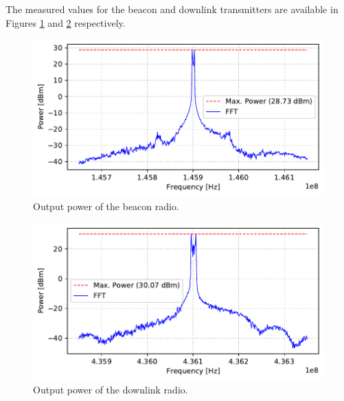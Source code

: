 The measured values for the beacon and downlink transmitters are available in Figures \ref{fig:beacon-power} and \ref{fig:downlink-power} respectively.

\begin{figure}[!ht]
    \begin{center}
        \includegraphics[width=\textwidth]{curves/beacon_output_power.pdf}
        \caption{Output power of the beacon radio.}
        \label{fig:beacon-power}
    \end{center}
\end{figure}

\begin{figure}[!ht]
    \begin{center}
        \includegraphics[width=\textwidth]{curves/downlink_output_power.pdf}
        \caption{Output power of the downlink radio.}
        \label{fig:downlink-power}
    \end{center}
\end{figure}
